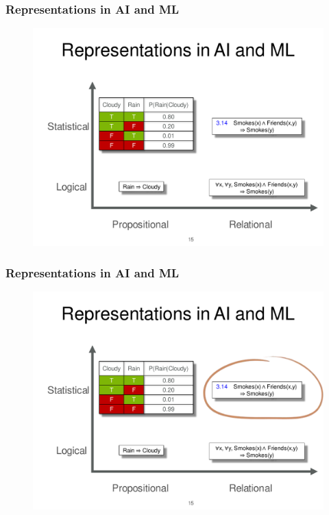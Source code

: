 \documentclass{beamer}
\begin{document}
\begin{frame}
\frametitle{Representations in AI and ML}
\begin{figure}[h]
\centering\includegraphics[width=0.95\linewidth]{ai-ml3.pdf}
\end{figure}
\end{frame}

\begin{frame}
\frametitle{Representations in AI and ML}
\begin{figure}[h]
\centering\includegraphics[width=0.95\linewidth]{ai-ml4.pdf}
\end{figure}
\end{frame}
\end{document}
